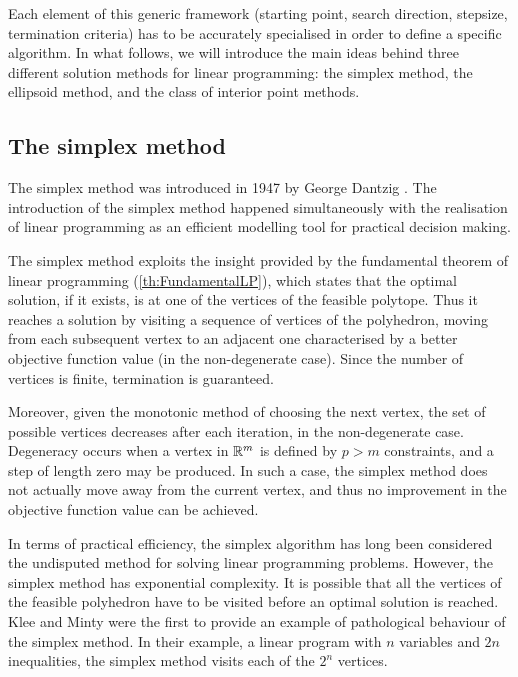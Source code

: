 Each element of this generic framework
(starting point, search direction, stepsize, termination criteria)
has to be accurately specialised in order to define a specific algorithm.
In what follows, we will introduce the main ideas behind three 
different solution methods for linear programming: the simplex method,
the ellipsoid method, and the class of interior point methods.

%
%
\subsection{The simplex method}

The simplex method was introduced in 1947 by George Dantzig 
\cite{Dantzig63}. The
introduction of the simplex method happened simultaneously with
the realisation of linear programming as an efficient modelling tool
for practical decision making. 

The simplex method exploits the insight provided by the fundamental 
theorem of linear programming (\ref{th:FundamentalLP}), which states that
the optimal solution, if it exists, is at one of the vertices
of the feasible polytope.
Thus it reaches a solution by visiting a sequence of 
vertices of the polyhedron, moving from each subsequent vertex to an adjacent 
one characterised by a better objective function value
(in the non-degenerate case). 
Since the number of vertices is finite, termination is guaranteed.

Moreover, given the monotonic
method of choosing the next vertex, the set of possible vertices 
decreases after each iteration, in the non-degenerate case.
Degeneracy
occurs when a vertex in $\mathbb{R}^m$ is defined by $p > m$ constraints,
and a step of length zero may be produced.
In such a case, the simplex method does not actually move away
from the current vertex, and thus no improvement in the objective
function value can be achieved.


In terms of practical efficiency, the simplex algorithm has 
long been considered the undisputed method for solving linear programming
problems.
However, the simplex method has exponential complexity. It is possible that all
the vertices of the feasible polyhedron have to be visited
before an optimal solution is reached.
Klee and Minty \cite{KleeMinty} were the first to provide an example 
of pathological behaviour of the simplex method.
In their example, a linear program with $n$ variables 
and $2n$ inequalities,
the simplex method visits each of the $2^n$ vertices.


